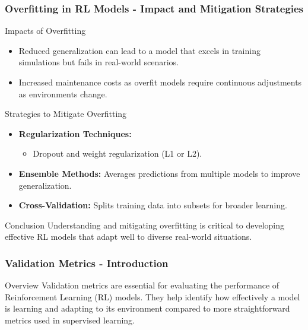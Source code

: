 \documentclass[aspectratio=169]{beamer}
\begin{document}
\begin{frame}[fragile]
    \frametitle{Overfitting in RL Models - Impact and Mitigation Strategies}
    \begin{block}{Impacts of Overfitting}
        \begin{itemize}
            \item Reduced generalization can lead to a model that excels in training simulations but fails in real-world scenarios.
            \item Increased maintenance costs as overfit models require continuous adjustments as environments change.
        \end{itemize}
    \end{block}
    
    \begin{block}{Strategies to Mitigate Overfitting}
        \begin{itemize}
            \item \textbf{Regularization Techniques:}
                \begin{itemize}
                    \item Dropout and weight regularization (L1 or L2).
                \end{itemize}
            \item \textbf{Ensemble Methods:} Averages predictions from multiple models to improve generalization.
            \item \textbf{Cross-Validation:} Splits training data into subsets for broader learning.
        \end{itemize}
    \end{block}
    
    \begin{block}{Conclusion}
        Understanding and mitigating overfitting is critical to developing effective RL models that adapt well to diverse real-world situations.
    \end{block}
\end{frame}

\begin{frame}[fragile]
    \frametitle{Validation Metrics - Introduction}
    \begin{block}{Overview}
        Validation metrics are essential for evaluating the performance of Reinforcement Learning (RL) models. They help identify how effectively a model is learning and adapting to its environment compared to more straightforward metrics used in supervised learning.
    \end{block}
\end{frame}
\end{document}
